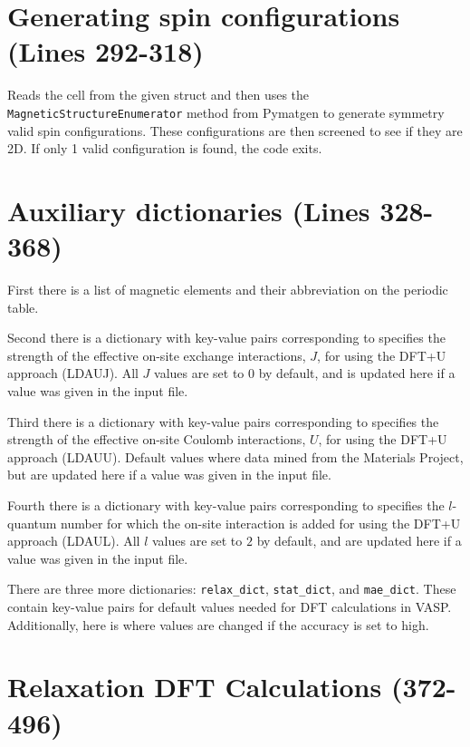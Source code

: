 \documentclass[12pt]{article}
\newcommand{\pmint}[1]{\texttt{#1}}
\begin{document}
\section*{Generating spin configurations (Lines 292-318)} %
Reads the cell from the given struct and then uses the \texttt{MagneticStructureEnumerator} method from Pymatgen to generate symmetry valid spin configurations. These configurations are then screened to see if they are 2D. If only 1 valid configuration is found, the code exits. 

\section*{Auxiliary dictionaries (Lines 328-368)} %

First there is a list of magnetic elements and their abbreviation on the periodic table. 

Second there is a dictionary with key-value pairs corresponding to specifies the strength of the effective on-site exchange interactions, $J$,  for using the DFT+U approach (LDAUJ). All $J$ values are set to $0$ by default, and is updated here if a value was given in the input file. 

Third there is a dictionary with key-value pairs corresponding to specifies the strength of the effective on-site Coulomb interactions, $U$,  for using the DFT+U approach (LDAUU). Default values where data mined from the Materials Project, but are updated here if a value was given in the input file.

Fourth there is a dictionary with key-value pairs corresponding to specifies the $l$-quantum number for which the on-site interaction is added  for using the DFT+U approach (LDAUL). All $l$ values are set to $2$ by default, and are updated here if a value was given in the input file.

There are three more dictionaries: \pmint{relax_dict}, \pmint{stat_dict}, and \pmint{mae_dict}. These contain key-value pairs for default values needed for DFT calculations in VASP. Additionally, here is where values are changed if the accuracy is set to high. 

\section*{Relaxation DFT Calculations (372-496) } %
\end{document}
